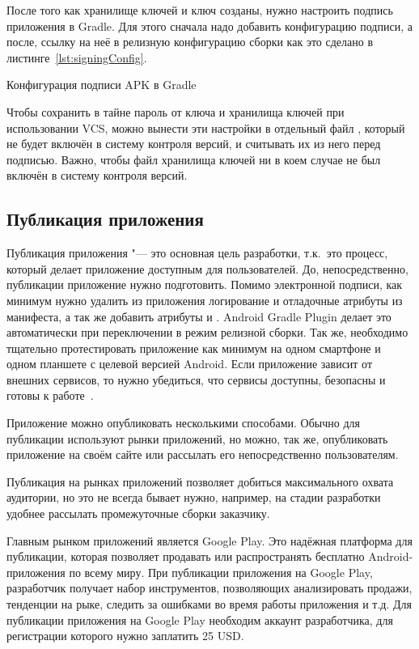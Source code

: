 После того как хранилище ключей и ключ созданы, нужно настроить подпись приложения в Gradle.
Для этого сначала надо добавить конфигурацию подписи, а после, ссылку на неё в релизную конфигурацию сборки как это сделано в листинге~\ref{lst:signingConfig}.

\begin{listing}[h]
  \caption{Конфигурация подписи APK в Gradle}
  \label{lst:signingConfig}
\end{listing}

Чтобы сохранить в тайне пароль от ключа и хранилища ключей при использовании VCS, можно вынести эти настройки в отдельный файл , который не будет включён в систему контроля версий, и считывать их из него перед подписью.
Важно, чтобы файл хранилища ключей ни в коем случае не был включён в систему контроля версий.

\subsection{Публикация приложения}
\label{subsec:publish}

Публикация приложения "--- это основная цель разработки, т.к.\ это процесс, который делает приложение доступным для пользователей.
До, непосредственно, публикации приложение нужно подготовить.
Помимо электронной подписи, как минимум нужно удалить из приложения логирование  и отладочные атрибуты из манифеста, а так же добавить атрибуты  и .
Android Gradle Plugin делает это автоматически при переключении в режим релизной сборки.
Так же, необходимо тщательно протестировать приложение как минимум на одном смартфоне и одном планшете с целевой версией Android.
Если приложение зависит от внешних сервисов, то нужно убедиться, что сервисы доступны, безопасны и готовы к работе~\cite{android:publish}.

Приложение можно опубликовать несколькими способами.
Обычно для публикации используют рынки приложений, но можно, так же, опубликовать приложение на своём сайте или рассылать его непосредственно пользователям.

Публикация на рынках приложений позволяет добиться максимального охвата аудитории, но это не всегда бывает нужно, например, на стадии разработки удобнее рассылать промежуточные сборки заказчику.

Главным рынком приложений является Google Play.
Это надёжная платформа для публикации, которая позволяет продавать или распространять бесплатно Android-приложения по всему миру.
При публикации приложения на Google Play, разработчик получает набор инструментов, позволяющих анализировать продажи, тенденции на рыке, следить за ошибками во время работы приложения и т.д.
Для публикации приложения на Google Play необходим аккаунт разработчика, для регистрации которого нужно заплатить 25 USD\@.

